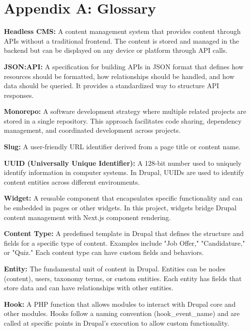 \appendix
\chapter*{Appendix A: Glossary}
\label{appendix:glossary}

\textbf{Headless CMS:} A content management system that provides content through APIs without a traditional frontend. The content is stored and managed in the backend but can be displayed on any device or platform through API calls.

\textbf{JSON:API:} A specification for building APIs in JSON format that defines how resources should be formatted, how relationships should be handled, and how data should be queried. It provides a standardized way to structure API responses.

\textbf{Monorepo:} A software development strategy where multiple related projects are stored in a single repository. This approach facilitates code sharing, dependency management, and coordinated development across projects.

\textbf{Slug:} A user-friendly URL identifier derived from a page title or content name. 

\textbf{UUID (Universally Unique Identifier):} A 128-bit number used to uniquely identify information in computer systems. In Drupal, UUIDs are used to identify content entities across different environments.

\textbf{Widget:} A reusable component that encapsulates specific functionality and can be embedded in pages or other widgets. In this project, widgets bridge Drupal content management with Next.js component rendering.

\textbf{Content Type:} A predefined template in Drupal that defines the structure and fields for a specific type of content. Examples include "Job Offer," "Candidature," or "Quiz." Each content type can have custom fields and behaviors.

\textbf{Entity:} The fundamental unit of content in Drupal. Entities can be nodes (content), users, taxonomy terms, or custom entities. Each entity has fields that store data and can have relationships with other entities.


\textbf{Hook:} A PHP function that allows modules to interact with Drupal core and other modules. Hooks follow a naming convention (hook\_event\_name) and are called at specific points in Drupal's execution to allow custom functionality.

